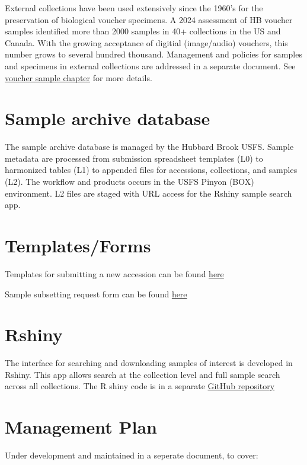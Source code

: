 \documentclass[
  letterpaper,
  DIV=11,
  numbers=noendperiod]{scrreprt}
\begin{document}
External collections have been used extensively since the 1960's for the
preservation of biological voucher specimens. A 2024 assessment of HB
voucher samples identified more than 2000 samples in 40+ collections in
the US and Canada. With the growing acceptance of digitial (image/audio)
vouchers, this number grows to several hundred thousand. Management and
policies for samples and specimens in external collections are addressed
in a separate document. See \href{VoucherSamples.qmd}{voucher sample
chapter} for more details.

\section{Sample archive database}\label{sample-archive-database}

The sample archive database is managed by the Hubbard Brook USFS. Sample
metadata are processed from submission spreadsheet templates (L0) to
harmonized tables (L1) to appended files for accessions, collections,
and samples (L2). The workflow and products occurs in the USFS Pinyon
(BOX) environment. L2 files are staged with URL access for the Rshiny
sample search app.

\section{Templates/Forms}\label{templatesforms}

Templates for submitting a new accession can be found \href{link}{here}

Sample subsetting request form can be found
\href{subsampling_request.pdf}{here}

\section{Rshiny}\label{rshiny}

The interface for searching and downloading samples of interest is
developed in Rshiny. This app allows search at the collection level and
full sample search across all collections. The R shiny code is in a
separate \href{link}{GitHub repository}

\section{Management Plan}\label{management-plan}

Under development and maintained in a seperate document, to cover:
\end{document}
